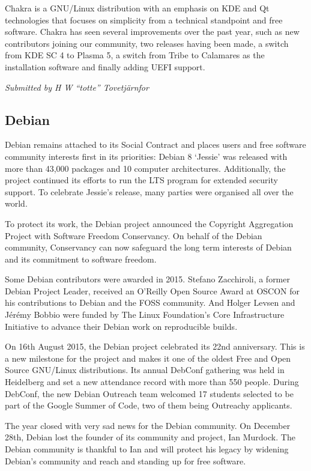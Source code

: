 \documentclass[letterpaper]{report}
\begin{document}
Chakra is a GNU/Linux distribution with an emphasis on KDE and Qt
technologies that focuses on simplicity from a technical standpoint and
free software.  Chakra has seen several improvements over the past year,
such as new contributors joining our community, two releases having been
made, a switch from KDE SC 4 to Plasma 5, a switch from Tribe to Calamares
as the installation software and finally adding UEFI support.

{\em Submitted by H W ``totte'' Tovetjärnfor}

\subsection{Debian}

Debian remains attached to its Social Contract and places users and free
software community interests first in its priorities: Debian 8 `Jessie'
was released with more than 43,000 packages and 10 computer architectures.
Additionally, the project continued its efforts to run the LTS program for
extended security support.  To celebrate Jessie's release, many parties
were organised all over the world.

To protect its work, the Debian project announced the Copyright
Aggregation Project with Software Freedom Conservancy.  On behalf of the
Debian community, Conservancy can now safeguard the long term interests of
Debian and its commitment to software freedom.

Some Debian contributors were awarded in 2015.  Stefano Zacchiroli, a
former Debian Project Leader, received an O'Reilly Open Source Award at
OSCON for his contributions to Debian and the FOSS community.  And Holger
Levsen and Jérémy Bobbio were funded by The Linux Foundation's Core
Infrastructure Initiative to advance their Debian work on reproducible
builds.

On 16th August 2015, the Debian project celebrated its 22nd anniversary.
This is a new milestone for the project and makes it one of the oldest
Free and Open Source GNU/Linux distributions.  Its annual DebConf
gathering was held in Heidelberg and set a new attendance record with more
than 550 people.  During DebConf, the new Debian Outreach team welcomed 17
students selected to be part of the Google Summer of Code, two of them
being Outreachy applicants.

The year closed with very sad news for the Debian community.  On December
28th, Debian lost the founder of its community and project, Ian Murdock.
The Debian community is thankful to Ian and will protect his legacy by
widening Debian's community and reach and standing up for free software.
\end{document}
